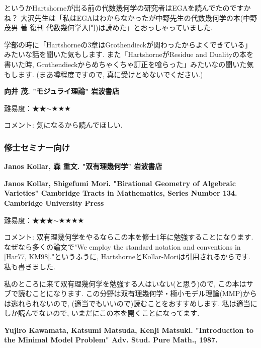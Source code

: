 というかHartshorneが出る前の代数幾何学の研究者はEGAを読んでたのですかね？ 
大沢先生は「私はEGAはわからなかったが中野先生の代数幾何学の本(中野茂男 著 復刊 代数幾何学入門)は読めた」とおっしゃっていました. 

学部の時に「Hartshorneの3章はGrothendieckが関わったからよくできている」みたいな話を聞いた気もします. また「HartshorneがResidue and Dualityの本を書いた時, Grothendieckからめちゃくちゃ訂正を喰らった」みたいなの聞いた気もします. (まあ噂程度ですので, 真に受けとめないでください.)

\vspace{8pt}



\textbf{向井 茂. "モジュライ理論" 岩波書店}

難易度：★★$\sim$★★★  \vspace{-6pt}

コメント: 気になるから読んでほしい. 

\subsubsection{修士セミナー向け}

\textbf{Janos Kollar, 森 重文. "双有理幾何学" 岩波書店} \vspace{-6pt}

\textbf{Janos Kollar, Shigefumi Mori. "Birational Geometry of Algebraic Varieties" Cambridge Tracts in Mathematics, Series Number 134. Cambridge University Press} \vspace{-6pt}

難易度：★★★$\sim$★★★★\vspace{-6pt} 

コメント: 双有理幾何学をやるならこの本を修士1年に勉強することになります. なぜなら多くの論文で"We employ the standard notation and conventions in [Har77, KM98]."というふうに, HartshorneとKollar-Moriは引用されるからです. 私も書きました. 

私のところに来て双有理幾何学を勉強する人はいない(と思う)ので, この本はサブで読むことになります. 
 この分野は双有理幾何学・極小モデル理論(MMP)からは逃れられないので, (適当でもいいので)読むことをおすすめします. 私は適当にしか読んでないので, いまだにこの本を開くことになってます. 
 \vspace{8pt}
 
 \textbf{Yujiro Kawamata, Katsumi Matsuda, Kenji Matsuki. "Introduction to the Minimal Model Problem" Adv. Stud. Pure Math., 1987. } \vspace{-6pt}

